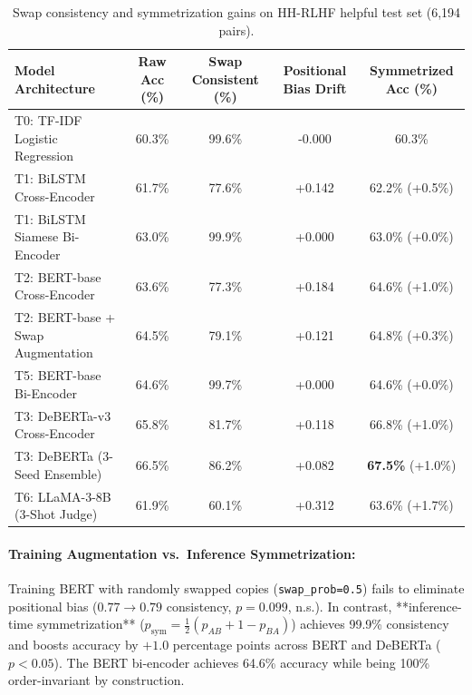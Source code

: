 \documentclass[12pt,a4paper]{article}
\newcommand{\sym}{\text{sym}}
\begin{document}
\begin{table}[H]
\centering
\small
\renewcommand{\arraystretch}{1.2}
\begin{tabular}{lcccc}
\toprule
\textbf{Model Architecture} & \textbf{Raw Acc (\%)} & \textbf{Swap Consistent (\%)} & \textbf{Positional Bias Drift} & \textbf{Symmetrized Acc (\%)} \\
\midrule
T0: TF-IDF Logistic Regression & 60.3\% & 99.6\% & -0.000 & 60.3\% \\
T1: BiLSTM Cross-Encoder & 61.7\% & 77.6\% & +0.142 & 62.2\% (+0.5\%) \\
T1: BiLSTM Siamese Bi-Encoder & 63.0\% & 99.9\% & +0.000 & 63.0\% (+0.0\%) \\
T2: BERT-base Cross-Encoder & 63.6\% & 77.3\% & +0.184 & 64.6\% (+1.0\%) \\
T2: BERT-base + Swap Augmentation & 64.5\% & 79.1\% & +0.121 & 64.8\% (+0.3\%) \\
T5: BERT-base Bi-Encoder & 64.6\% & 99.7\% & +0.000 & 64.6\% (+0.0\%) \\
T3: DeBERTa-v3 Cross-Encoder & 65.8\% & 81.7\% & +0.118 & 66.8\% (+1.0\%) \\
T3: DeBERTa (3-Seed Ensemble) & 66.5\% & 86.2\% & +0.082 & \textbf{67.5\%} (+1.0\%) \\
T6: LLaMA-3-8B (3-Shot Judge) & 61.9\% & 60.1\% & +0.312 & 63.6\% (+1.7\%) \\
\bottomrule
\end{tabular}
\caption{Swap consistency and symmetrization gains on HH-RLHF helpful test set (6,194 pairs).}
\label{tab:swap}
\end{table}

\paragraph{Training Augmentation vs.\ Inference Symmetrization:}
Training BERT with randomly swapped copies (\texttt{swap\_prob=0.5}) fails to eliminate positional bias ($0.77 \to 0.79$ consistency, $p = 0.099$, n.s.). In contrast, **inference-time symmetrization** ($p_{\sym} = \frac{1}{2}(p_{AB} + 1 - p_{BA})$) achieves 99.9\% consistency and boosts accuracy by $+1.0$ percentage points across BERT and DeBERTa ($p < 0.05$). The BERT bi-encoder achieves 64.6\% accuracy while being 100\% order-invariant by construction.

\end{document}
